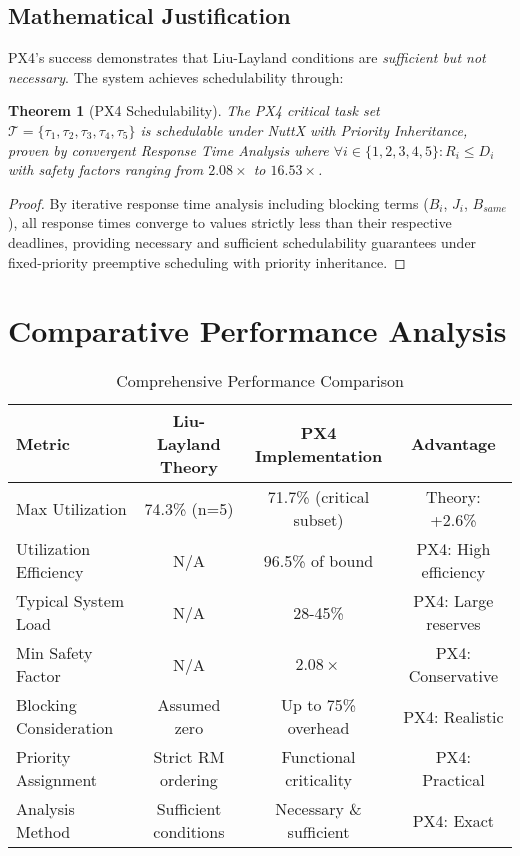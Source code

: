 \documentclass[12pt,a4paper]{article}
\newtheorem{theorem}{Theorem}
\begin{document}
\subsection{Mathematical Justification}

PX4's success demonstrates that Liu-Layland conditions are \emph{sufficient but not necessary}. The system achieves schedulability through:

\begin{theorem}[PX4 Schedulability]
The PX4 critical task set $\mathcal{T} = \{\tau_1, \tau_2, \tau_3, \tau_4, \tau_5\}$ is schedulable under NuttX with Priority Inheritance, proven by convergent Response Time Analysis where $\forall i \in \{1,2,3,4,5\}: R_i \leq D_i$ with safety factors ranging from $2.08\times$ to $16.53\times$.
\end{theorem}

\begin{proof}
By iterative response time analysis including blocking terms ($B_i$, $J_i$, $B_{same}$), all response times converge to values strictly less than their respective deadlines, providing necessary and sufficient schedulability guarantees under fixed-priority preemptive scheduling with priority inheritance.
\end{proof}

\section{Comparative Performance Analysis}

\begin{table}[H]
\centering
\begin{tabular}{|l|c|c|c|}
\hline
\textbf{Metric} & \textbf{Liu-Layland Theory} & \textbf{PX4 Implementation} & \textbf{Advantage} \\
\hline
Max Utilization & 74.3\% (n=5) & 71.7\% (critical subset) & Theory: +2.6\% \\
Utilization Efficiency & N/A & 96.5\% of bound & PX4: High efficiency \\
Typical System Load & N/A & 28-45\% & PX4: Large reserves \\
Min Safety Factor & N/A & $2.08\times$ & PX4: Conservative \\
Blocking Consideration & Assumed zero & Up to 75\% overhead & PX4: Realistic \\
Priority Assignment & Strict RM ordering & Functional criticality & PX4: Practical \\
Analysis Method & Sufficient conditions & Necessary \& sufficient & PX4: Exact \\
\hline
\end{tabular}
\caption{Comprehensive Performance Comparison}
\end{table}
\end{document}
